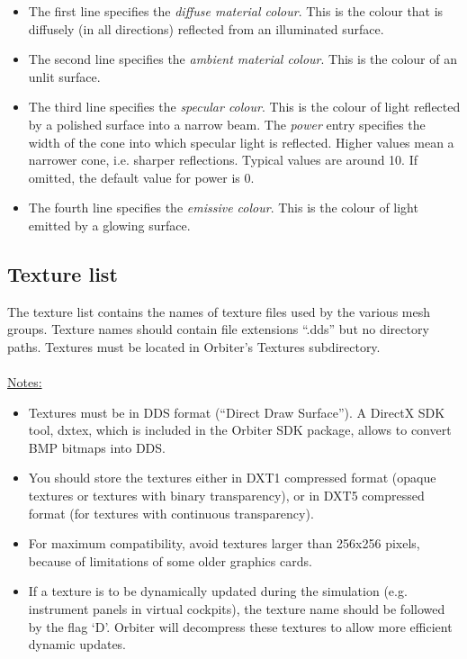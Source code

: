\documentclass[Orbiter Developer Manual.tex]{subfiles}
\begin{document}
\begin{itemize}
\item The first line specifies the \textit{diffuse material colour}. This is the colour that is diffusely (in all directions) reflected from an illuminated surface.
\item The second line specifies the \textit{ambient material colour}. This is the colour of an unlit surface.
\item The third line specifies the \textit{specular colour}. This is the colour of light reflected by a polished surface into a narrow beam. The \textit{power} entry specifies the width of the cone into which specular light is reflected. Higher values mean a narrower cone, i.e. sharper reflections. Typical values are around 10. If omitted, the default value for power is 0.
\item The fourth line specifies the \textit{emissive colour}. This is the colour of light emitted by a glowing surface.
\end{itemize}


\subsection{Texture list}
The texture list contains the names of texture files used by the various mesh groups. Texture names should contain file extensions “.dds” but no directory paths. Textures must be located in Orbiter’s Textures subdirectory.\\
\\
\underline{Notes:}

\begin{itemize}
\item Textures must be in DDS format (“Direct Draw Surface”). A DirectX SDK tool, dxtex, which is included in the Orbiter SDK package, allows to convert BMP bitmaps into DDS.
\item You should store the textures either in DXT1 compressed format (opaque textures or textures with binary transparency), or in DXT5 compressed format (for textures with continuous transparency).
\item For maximum compatibility, avoid textures larger than 256x256 pixels, because of limitations of some older graphics cards.
\item If a texture is to be dynamically updated during the simulation (e.g. instrument panels in virtual cockpits), the texture name should be followed by the flag ‘D’. Orbiter will decompress these textures to allow more efficient dynamic updates.
\end{itemize}
\end{document}
